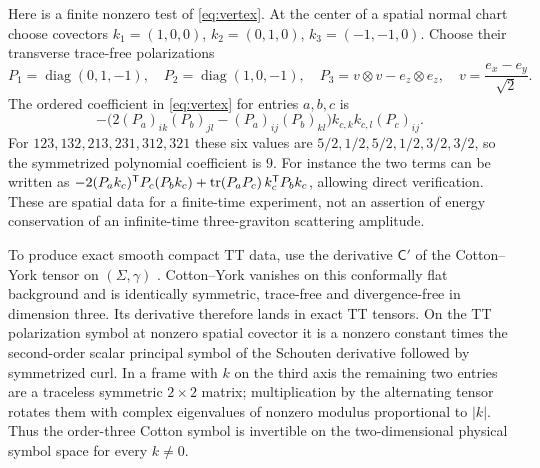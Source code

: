 Here is a finite nonzero test of \eqref{eq:vertex}. At the center of a spatial normal chart choose covectors \(k_1=(1,0,0)\), \(k_2=(0,1,0)\), \(k_3=(-1,-1,0)\). Choose their transverse trace-free polarizations
\[
 P_1=\operatorname{diag}(0,1,-1),\quad
 P_2=\operatorname{diag}(1,0,-1),\quad
 P_3=v\otimes v-e_z\otimes e_z,\quad v=\frac{e_x-e_y}{\sqrt2}.
\]
The ordered coefficient in \eqref{eq:vertex} for entries \(a,b,c\) is
\[
 -\bigl(2(P_a)_{ik}(P_b)_{jl}-(P_a)_{ij}(P_b)_{kl}\bigr)
                         k_{c,k}k_{c,l}(P_c)_{ij}.
\]
For \(123,132,213,231,312,321\) these six values are \(5/2,1/2,5/2,1/2,3/2,3/2\), so the symmetrized polynomial coefficient is \(9\). For instance the two terms can be written as
\(-2(P_ak_c)^{\mathsf T}P_c(P_bk_c)+
 \operatorname{tr}(P_aP_c)\,k_c^{\mathsf T}P_b k_c\), allowing direct verification. These are spatial data for a finite-time experiment, not an assertion of energy conservation of an infinite-time three-graviton scattering amplitude.

To produce exact smooth compact TT data, use the derivative \(\mathsf C'\) of the Cotton--York tensor on \((\Sigma,\gamma)\) \cite{Beig}. Cotton--York vanishes on this conformally flat background and is identically symmetric, trace-free and divergence-free in dimension three. Its derivative therefore lands in exact TT tensors. On the TT polarization symbol at nonzero spatial covector it is a nonzero constant times the second-order scalar principal symbol of the Schouten derivative followed by symmetrized curl. In a frame with \(k\) on the third axis the remaining two entries are a traceless symmetric \(2\times 2\) matrix; multiplication by the alternating tensor rotates them with complex eigenvalues of nonzero modulus proportional to \(|k|\). Thus the order-three Cotton symbol is invertible on the two-dimensional physical symbol space for every \(k\ne0\).

